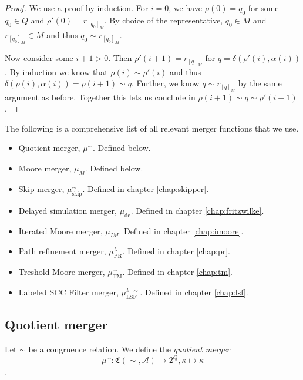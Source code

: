 \begin{proof}
	We use a proof by induction. For $i = 0$, we have $\rho(0) = q_0$ for some $q_0 \in Q$ and $\rho'(0) = r_{[q_0]_M}$. By choice of the representative, $q_0 \in M$ and $r_{[q_0]_M} \in M$ and thus $q_0 \sim r_{[q_0]_M}$.
	
	Now consider some $i+1 > 0$. Then $\rho'(i+1) = r_{[q]_M}$ for $q = \delta(\rho'(i), \alpha(i))$. By induction we know that $\rho(i) \sim \rho'(i)$ and thus $\delta(\rho(i), \alpha(i)) = \rho(i+1) \sim q$. Further, we know $q \sim r_{[q]_M}$ by the same argument as before. Together this lets us conclude in $\rho(i+1) \sim q \sim \rho'(i+1)$.
\end{proof}

\vspace{10pt}

The following is a comprehensive list of all relevant merger functions that we use.

\begin{itemize}
	\item Quotient merger, $\mu_\div^\sim$. Defined below.
	\item Moore merger, $\mu_M$. Defined below.
	\item Skip merger, $\mu_\text{skip}^\sim$. Defined in chapter \ref{chap:skipper}.
	\item Delayed simulation merger, $\mu_\text{de}$. Defined in chapter \ref{chap:fritzwilke}.
	\item Iterated Moore merger, $\mu_{IM}$. Defined in chapter \ref{chap:imoore}.
	\item Path refinement merger, $\mu_\text{PR}^\lambda$. Defined in chapter \ref{chap:pr}.
	\item Treshold Moore merger, $\mu_\text{TM}^\sim$. Defined in chapter \ref{chap:tm}.
	\item Labeled SCC Filter merger, $\mu_\text{LSF}^{k,\sim}$. Defined in chapter \ref{chap:lsf}.
\end{itemize}

\vspace{5pt}

\subsection{Quotient merger}
\begin{defn}
	Let $\sim$ be a congruence relation. We define the \emph{quotient merger} $$\mu^\sim_\div : \mathfrak{C}(\sim, \mathcal{A}) \rightarrow 2^Q, \kappa \mapsto \kappa$$. 
\end{defn}


